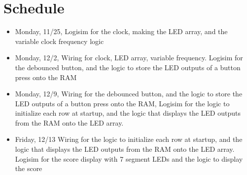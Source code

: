 \documentclass{article}
\begin{document}
    \section{Schedule}
    \begin{itemize}
        \item Monday, 11/25, Logisim for the clock, making the LED array, and the variable clock frequency logic
        \item Monday, 12/2, Wiring for clock, LED array, variable frequency. Logisim for the debounced button, and the logic to store the LED outputs of a button press onto the RAM
        \item Monday, 12/9, Wiring for the debounced button, and the logic to store the LED outputs of a button press onto the RAM, Logisim for the logic to initialize each row at startup, and the logic that displays the LED outputs from the RAM onto the LED array.
        \item Friday, 12/13 Wiring for the logic to initialize each row at startup, and the logic that displays the LED outputs from the RAM onto the LED array. Logisim for the score display with 7 segment LEDs and the logic to display the score
        
    \end{itemize}
   
\end{document}
